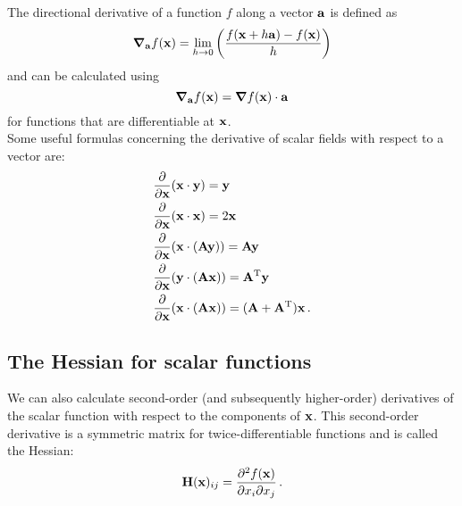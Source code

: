         The directional derivative of a function $f$ along a vector $\vb{a}$ is defined as
        \begin{equation}
            \grad_{\vb{a}} f(\vb{x}) = \lim_{h \to 0} \qty( \frac{f(\vb{x} + h \vb{a}) - f(\vb{x})}{h} )
        \end{equation}
        and can be calculated using
        \begin{equation}
            \grad_{\vb{a}} f(\vb{x}) = \grad{f(\vb{x})} \cdot \vb{a}
        \end{equation}
        for functions that are differentiable at $\vb{x}$. \\

        Some useful formulas concerning the derivative of scalar fields with respect to a vector are:
        \begin{align}
            & \pdv{\vb{x}} (\vb{x} \cdot \vb{y}) = \vb{y} \\
            & \pdv{\vb{x}} (\vb{x} \cdot \vb{x}) = 2 \vb{x} \\
            & \pdv{\vb{x}} (\vb{x} \cdot (\vb{A} \vb{y})) = \vb{A} \vb{y} \\
            & \pdv{\vb{x}} (\vb{y} \cdot (\vb{A} \vb{x})) = \vb{A}^\text{T} \vb{y} \\
            & \pdv{\vb{x}} (\vb{x} \cdot (\vb{A} \vb{x})) = (\vb{A} + \vb{A}^\text{T}) \vb{x} \thinspace .
        \end{align}

    \subsection{The Hessian for scalar functions}
        We can also calculate second-order (and subsequently higher-order) derivatives of the scalar function with respect to the components of $\vb{x}$. This second-order derivative is a symmetric matrix for twice-differentiable functions and is called the Hessian:
        \begin{equation}
            \vb{H}(\vb{x})_{ij} = \pdv{f(\vb{x})}{x_i}{x_j} \thinspace .
        \end{equation}

